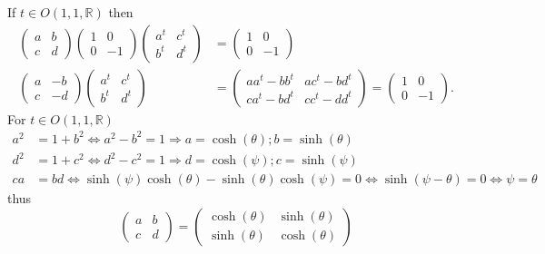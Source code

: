 \documentclass[aps,preprint]{revtex4}
\begin{document}
If $t\in O\left( 1,1,\mathbb{R}\right) $ then%
\begin{align}
\left( 
\begin{array}{cc}
a & b \\ 
c & d%
\end{array}%
\right) \left( 
\begin{array}{cc}
1 & 0 \\ 
0 & -1%
\end{array}%
\right) \left( 
\begin{array}{cc}
a^{t} & c^{t} \\ 
b^{t} & d^{t}%
\end{array}%
\right) & =\left( 
\begin{array}{cc}
1 & 0 \\ 
0 & -1%
\end{array}%
\right) \\
\left( 
\begin{array}{cc}
a & -b \\ 
c & -d%
\end{array}%
\right) \left( 
\begin{array}{cc}
a^{t} & c^{t} \\ 
b^{t} & d^{t}%
\end{array}%
\right) & =\left( 
\begin{array}{cc}
aa^{t}-bb^{t} & ac^{t}-bd^{t} \\ 
ca^{t}-bd^{t} & cc^{t}-dd^{t}%
\end{array}%
\right) =\left( 
\begin{array}{cc}
1 & 0 \\ 
0 & -1%
\end{array}%
\right) .
\end{align}%
For $t\in O\left( 1,1,\mathbb{R}\right) $ 
\begin{align}
a^{2}& =1+b^{2}\Longleftrightarrow a^{2}-b^{2}=1\Rightarrow a=\cosh \left(
\theta \right) ;b=\sinh \left( \theta \right) \\
d^{2}& =1+c^{2}\Longleftrightarrow d^{2}-c^{2}=1\Rightarrow d=\cosh \left(
\psi \right) ;c=\sinh \left( \psi \right) \\
ca& =bd\Leftrightarrow \sinh \left( \psi \right) \cosh \left( \theta \right)
-\sinh \left( \theta \right) \cosh \left( \psi \right) =0\Leftrightarrow
\sinh \left( \psi -\theta \right) =0\Leftrightarrow \psi =\theta
\end{align}%
thus%
\begin{equation}
\left( 
\begin{array}{cc}
a & b \\ 
c & d%
\end{array}%
\right) =\left( 
\begin{array}{cc}
\cosh \left( \theta \right) & \sinh \left( \theta \right) \\ 
\sinh \left( \theta \right) & \cosh \left( \theta \right)%
\end{array}%
\right)
\end{equation}%
\end{document}
